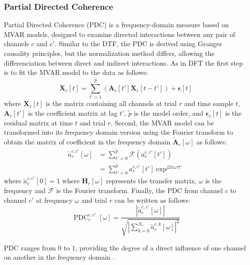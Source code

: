 \documentclass[runningheads]{llncs}
\newcommand{\mat}[1]{\bm {#1}}
\newenvironment{reviewer}{\setcounter{pointcounter}{1}}{}
\newcommand{\changes}[1]{\textcolor[rgb]{1.00,0.00,0.00}{#1}}
\begin{document}
\begin{reviewer}
{\subsubsection{Partial Directed Coherence}
\changes{
Partial Directed Coherence (PDC) is a frequency-domain measure based on MVAR models, designed to examine directed interactions between any pair of channels $c$ and $c'$. Similar to the DTF, the PDC is derived using Granger causality principles, but the normalization method differs, allowing the differenciation between direct and indirect interactions. As in DFT the first step is to fit the MVAR model to the data as follows:
\begin{equation}
    \mat{X}_{r}[t] = \sum_{t'=1}^{\tilde{p}} \left( \mat{A}_{r}[t'] \mat{X}_{r}[t-t'] \right) + \mat{\epsilon}[t]
\end{equation}
where $\mat{X}_{r}[t]$ is the matrix containing all channels at trial $r$ and time sample $t$, $\mat{A}_{r}[t']$ is the coefficient matrix at lag $t'$, $\tilde{p}$ is the model order, and $\mat{\epsilon}_{r}[t]$ is the residual matrix at time $t$ and trial $r$. Second, the MVAR model can be transformed into its frequency domain version using the Fourier transform to obtain the matrix of coefficient in the frequency  domain $\tilde{\mat{A}}_{r}[\omega]$ as follows:
\begin{equation}
    \begin{aligned}
    \tilde{a}^{c,c'}_{r}[\omega] &= \sum_{t'=0}^{\tilde{p}} \mathscr{F}\left( {a}^{c,c'}_{r}[t'] \right) \\
                                &= \sum_{t'=0}^{\tilde{p}} {a}^{c,c'}_{r}[t'] \exp^{j2\pi \omega \tau t'}
    \end{aligned}
\end{equation}
where $\tilde{a}^{c,c'}_{r}[0] = 1$
where $\mat{H}_{r}[\omega]$ represents the transfer matrix, $\omega$ is the frequency and $\mathscr{F}$ is the Fourier transform. Finally, the PDC from channel $c$ to channel $c'$ at frequency $\omega$ and trial $r$ can be written as follows:
\begin{equation}
    \operatorname{PDC}^{c,c'}_{r}[\omega] =   \frac{\left|\tilde{a}^{c,c'}_{r}[\omega]\right|}{\sqrt{\left|\sum_{k=0}^{N_c}\tilde{a}^{c,k}_{r}[\omega]\right|^{2}}} 
\end{equation}
}

PDC ranges from $0$ to $1$, providing the degree of a direct influence of one channel on another in the frequency domain \cite{gaxiola2017using}.

}
\end{reviewer}
\end{document}
